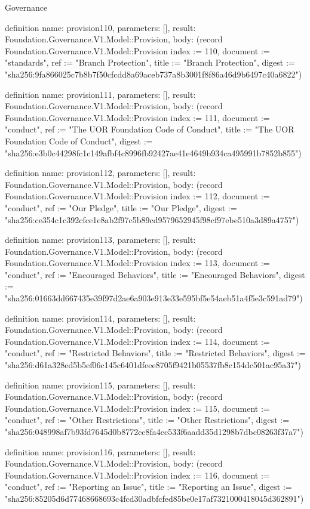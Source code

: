 \begin{lexlean}{Governance}
\begin{semanticmodule}
definition{
  name: provision110,
  parameters: [],
  result: Foundation.Governance.V1.Model::Provision,
  body: (record Foundation.Governance.V1.Model::Provision {index := 110, document := "standards", ref := "Branch Protection", title := "Branch Protection", digest := "sha256:9fa866025c7b8b7f50cfcdd8a69aceb737a8b3001f8f86a46d9b6497c40a6822"})
}

definition{
  name: provision111,
  parameters: [],
  result: Foundation.Governance.V1.Model::Provision,
  body: (record Foundation.Governance.V1.Model::Provision {index := 111, document := "conduct", ref := "The UOR Foundation Code of Conduct", title := "The UOR Foundation Code of Conduct", digest := "sha256:e3b0c44298fc1c149afbf4c8996fb92427ae41e4649b934ca495991b7852b855"})
}

definition{
  name: provision112,
  parameters: [],
  result: Foundation.Governance.V1.Model::Provision,
  body: (record Foundation.Governance.V1.Model::Provision {index := 112, document := "conduct", ref := "Our Pledge", title := "Our Pledge", digest := "sha256:ce354c1c392cfce1e8ab2f97c5b89cd9579652945f98cf97ebe510a3d89a4757"})
}

definition{
  name: provision113,
  parameters: [],
  result: Foundation.Governance.V1.Model::Provision,
  body: (record Foundation.Governance.V1.Model::Provision {index := 113, document := "conduct", ref := "Encouraged Behaviors", title := "Encouraged Behaviors", digest := "sha256:01663dd667435e39f97d2ae6a903e913e33e595bf5e54aeb51a4f5e3c591ad79"})
}

definition{
  name: provision114,
  parameters: [],
  result: Foundation.Governance.V1.Model::Provision,
  body: (record Foundation.Governance.V1.Model::Provision {index := 114, document := "conduct", ref := "Restricted Behaviors", title := "Restricted Behaviors", digest := "sha256:d61a328ed5b5ef06c145c6401dfeee8705f9421b05537fb8c154dc501ac95a37"})
}

definition{
  name: provision115,
  parameters: [],
  result: Foundation.Governance.V1.Model::Provision,
  body: (record Foundation.Governance.V1.Model::Provision {index := 115, document := "conduct", ref := "Other Restrictions", title := "Other Restrictions", digest := "sha256:048998af7b93fd7645d0b8772cc8fa4ec533f6aadd35d1298b7dbc08263f37a7"})
}

definition{
  name: provision116,
  parameters: [],
  result: Foundation.Governance.V1.Model::Provision,
  body: (record Foundation.Governance.V1.Model::Provision {index := 116, document := "conduct", ref := "Reporting an Issue", title := "Reporting an Issue", digest := "sha256:85205d6d77468668693c4fcd30adbfcfed85be0e17af7321000418045d362891"})
}


\end{semanticmodule}
\end{lexlean}
